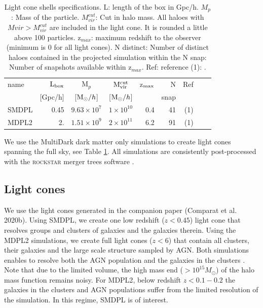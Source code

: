 \documentclass[fleqn,usenatbib,onecolumn]{mnras}
\begin{document}
\begin{table}
	\centering
	\caption{Light cone shells specifications. 
	L: length of the box in Gpc/h.
	$M_p$: Mass of the particle. 
	$M^{cut}_{vir}$: Cut in halo mass. All haloes with $M{vir}>M^{cut}_{vir}$ are included in the light cone. It is rounded a little above 100 particles. 
	z$_{max}$: maximum redshift to the observer (minimum is 0 for all light cones). 
	N distinct: Number of distinct haloes contained in the projected simulation within the 
	N snap: Number of snapshots available within z$_{max}$.
	Ref: reference (1): \citet{Klypin2016}.
	}
	\label{tab:light:cones}
	\begin{tabular}{lr cc rrr rr} 
	\hline
name             &  ${\rm L_{box}}$      & M$_p$    & ${\rm M^{cut}_{vir}}$     & z${\rm _{max}}$ &  N & Ref\\%
                 & [Gpc/h] & [${\rm M_\odot/}h$] &   [${\rm M_\odot/}h$] & & snap & \\
\hline
\textsc{SMDPL }   & 0.45  & $9.63\times10^{7}$ & $1\times10^{10}$ & 0.4 & 41  & (1) \\ %
\textsc{MDPL2 }   & 2.   & $1.51\times10^{9}$ & $2\times10^{11}$ & 6.2    & 91  & (1) \\ %
\hline
	\end{tabular}
\end{table}

We use the MultiDark \citep[\textsc{MDPL2, SMDPL}][]{Klypin2016} dark matter only simulations to create light cones spanning the full sky, see Table \ref{tab:light:cones}. 
All simulations are consistently post-processed with the \textsc{rockstar} merger trees software \citep{Behroozi2013}. 

\subsection{Light cones}

We use the light cones generated in the companion paper (Comparat et al. 2020b). 
Using \textsc{SMDPL}, we create one low redshift ($z<0.45$) light cone that resolves groups and clusters of galaxies and the galaxies therein. 
Using the \textsc{MDPL2} simulations, we create full light cones ($z<6$) that contain all clusters, their galaxies and the large scale structure sampled by AGN. 
Both simulations enables to resolve both the AGN population and the galaxies in the clusters \citep{2018MNRAS.tmp.3272G,2019MNRAS.tmp.1335C}. 
Note that due to the limited volume, the high mass end ($>10^{15}M_\odot$) of the halo mass function remains noisy. 
For \textsc{MDPL2}, below redshift $z<0.1 - 0.2$ the galaxies in the clusters and AGN populations suffer from the limited resolution of the simulation. In this regime, \textsc{SMDPL} is of interest.  
\end{document}
